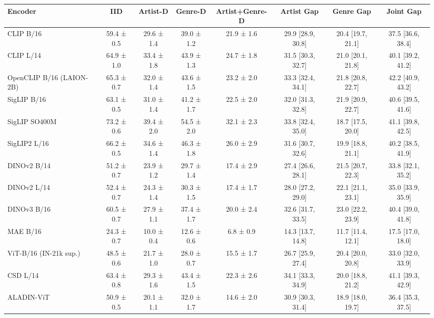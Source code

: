 \begin{tabular}{lccccccc}
\toprule
Encoder & IID & Artist-D & Genre-D & Artist+Genre-D & Artist Gap & Genre Gap & Joint Gap \\
\midrule
CLIP B/16 & 59.4 ± 0.5 & 29.6 ± 1.4 & 39.0 ± 1.2 & 21.9 ± 1.6 & 29.9 [28.9, 30.8] & 20.4 [19.7, 21.1] & 37.5 [36.6, 38.4] \\
CLIP L/14 & 64.9 ± 1.0 & 33.4 ± 1.8 & 43.9 ± 1.3 & 24.7 ± 1.8 & 31.5 [30.3, 32.7] & 21.0 [20.1, 21.8] & 40.1 [39.2, 41.2] \\
OpenCLIP B/16 (LAION-2B) & 65.3 ± 0.7 & 32.0 ± 1.4 & 43.6 ± 1.5 & 23.2 ± 2.0 & 33.3 [32.4, 34.1] & 21.8 [20.8, 22.7] & 42.2 [40.9, 43.2] \\
SigLIP B/16 & 63.1 ± 0.5 & 31.0 ± 1.4 & 41.2 ± 1.7 & 22.5 ± 2.0 & 32.0 [31.3, 32.8] & 21.9 [20.9, 22.7] & 40.6 [39.5, 41.6] \\
SigLIP SO400M & 73.2 ± 0.6 & 39.4 ± 2.0 & 54.5 ± 2.0 & 32.1 ± 2.3 & 33.8 [32.4, 35.0] & 18.7 [17.5, 20.0] & 41.1 [39.8, 42.5] \\
SigLIP2 L/16 & 66.2 ± 0.5 & 34.6 ± 1.4 & 46.3 ± 1.8 & 26.0 ± 2.9 & 31.6 [30.7, 32.6] & 19.9 [18.8, 21.1] & 40.2 [38.5, 41.9] \\
DINOv2 B/14 & 51.2 ± 0.7 & 23.9 ± 1.2 & 29.7 ± 1.4 & 17.4 ± 2.9 & 27.4 [26.6, 28.1] & 21.5 [20.7, 22.3] & 33.8 [32.1, 35.2] \\
DINOv2 L/14 & 52.4 ± 0.7 & 24.3 ± 1.4 & 30.3 ± 1.5 & 17.4 ± 1.7 & 28.0 [27.2, 29.0] & 22.1 [21.1, 23.1] & 35.0 [33.9, 35.9] \\
DINOv3 B/16 & 60.5 ± 0.7 & 27.9 ± 1.1 & 37.4 ± 1.7 & 20.0 ± 2.4 & 32.6 [31.7, 33.5] & 23.0 [22.2, 23.9] & 40.4 [39.0, 41.8] \\
MAE B/16 & 24.3 ± 0.7 & 10.0 ± 0.4 & 12.6 ± 0.6 & 6.8 ± 0.9 & 14.3 [13.7, 14.8] & 11.7 [11.4, 12.1] & 17.5 [17.0, 18.0] \\
ViT-B/16 (IN-21k sup.) & 48.5 ± 0.6 & 21.7 ± 1.0 & 28.0 ± 0.7 & 15.5 ± 1.7 & 26.7 [25.9, 27.4] & 20.4 [20.0, 20.8] & 33.0 [32.0, 33.9] \\
CSD L/14 & 63.4 ± 0.8 & 29.3 ± 1.6 & 43.4 ± 1.5 & 22.3 ± 2.6 & 34.1 [33.3, 34.9] & 20.0 [18.8, 21.2] & 41.1 [39.3, 42.9] \\
ALADIN-ViT & 50.9 ± 0.5 & 20.1 ± 1.1 & 32.0 ± 1.7 & 14.6 ± 2.0 & 30.9 [30.3, 31.4] & 18.9 [18.0, 19.7] & 36.4 [35.3, 37.5] \\
\bottomrule
\end{tabular}
